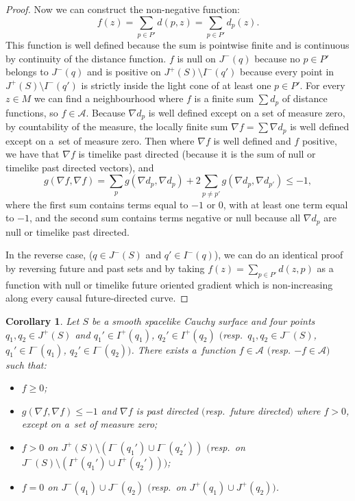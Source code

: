 \documentclass[11pt]{article}
\newtheorem{corollary}{Corollary}
\newcommand{\parenthese}[1]{\left( {#1} \right)}
\begin{document}
\begin{proof}
Now we can construct the non-negative function:
\[
f(z) = \sum_{p \in P'} d(p,z) = \sum_{p \in P'} d_p(z).
\]
This function is well def\/ined because the sum is pointwise f\/inite and is continuous by continuity of the distance function. $f$ is null on $J^-(q)$ because no $p \in P'$ belongs to $J^-(q)$ and is positive on $J^+(S) \setminus I^-(q')$ because every point in $J^+(S) \setminus I^-(q')$ is strictly inside the light cone of at least one $p \in P'$. For every $z \in M$ we can f\/ind a neighbourhood where $f$ is  a f\/inite sum $\sum d_p$ of distance functions, so $f\in\mathcal A$. Because $\nabla d_p$ is well def\/ined except on a set of measure zero, by countability of the measure, the locally f\/inite sum $\nabla f = \sum \nabla d_p$ is well def\/ined except on a~set of measure zero. Then where $\nabla f$ is well def\/ined and $f$ positive, we have that $\nabla f$ is timelike past directed (because it is the sum of null or timelike past directed vectors), and
\[
g( \nabla f, \nabla f ) =  \sum_{p} g( \nabla d_p, \nabla d_p ) +  2 \sum_{p \neq p'} g( \nabla d_p, \nabla d_{p'} ) \leq -1,
\]
where the f\/irst sum contains terms equal to $-1$ or $0$, with at least one term equal to $-1$, and the second sum contains terms negative or null because all $\nabla d_p$ are null or timelike past directed.

In the reverse case, ($q \in J^-(S)$ and $q' \in I^-(q)$), we can do an identical proof by reversing future and past sets and by taking $f(z) = \sum_{p \in P'} d(z,p)$ as a function with null or timelike future oriented gradient which is non-increasing along every causal future-directed curve.
\end{proof}

\begin{corollary}\label{corollaryprincipal}
Let $S$ be a smooth spacelike Cauchy surface and four points $q_1,q_2 \in J^+(S)$ and $q_1' \in I^+(q_1)$, $q_2' \in I^+(q_2)$ $($resp.\ $q_1,q_2 \in J^-(S)$, $q_1' \in I^-(q_1)$, $q_2' \in I^-(q_2))$. There exists a~function $f \in \mathcal A$ $($resp. $-f \in \mathcal A)$ such that:
\begin{itemize}\itemsep=0pt
\item $f \geq 0 $;
\item $g( \nabla f, \nabla f ) \leq -1$ and $\nabla f$ is past directed $($resp.\ future directed$)$ where $f > 0$, except on a~set of measure zero;
\item $f > 0$ on $J^+(S) \setminus \parenthese{I^-(q_1') \cup I^-(q_2')}$ $($resp.\ on $J^-(S) \setminus \parenthese{I^+(q_1') \cup I^+(q_2')})$;
\item $f = 0$ on $J^-(q_1) \cup J^-(q_2)$ $($resp.\ on $J^+(q_1) \cup J^+(q_2))$.
\end{itemize}
\end{corollary}
\end{document}
